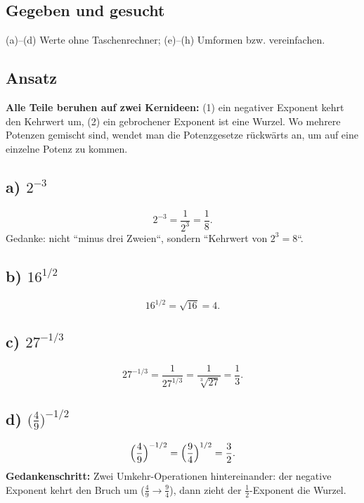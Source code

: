 

\subsection*{Gegeben und gesucht}
(a)--(d) Werte ohne Taschenrechner; (e)--(h) Umformen bzw. vereinfachen.

\subsection*{Ansatz}
\textbf{Alle Teile beruhen auf zwei Kernideen:} (1) ein negativer
Exponent kehrt den Kehrwert um, (2) ein gebrochener Exponent ist eine
Wurzel. Wo mehrere Potenzen gemischt sind, wendet man die
Potenzgesetze rückwärts an, um auf eine einzelne Potenz zu kommen.

\subsection*{a) $2^{-3}$}
\begin{equation}
  2^{-3}=\frac1{2^3}=\frac18 .
\end{equation}
Gedanke: nicht ``minus drei Zweien``, sondern ``Kehrwert von
$2^3=8$``.

\subsection*{b) $16^{1/2}$}
\begin{equation}
  16^{1/2}=\sqrt{16}=4 .
\end{equation}

\subsection*{c) $27^{-1/3}$}
\begin{equation}
  27^{-1/3}=\frac1{27^{1/3}}=\frac1{\sqrt[3]{27}}=\frac13 .
\end{equation}

\subsection*{d) $\bigl(\frac49\bigr)^{-1/2}$}
\begin{equation}
  \Bigl(\frac49\Bigr)^{-1/2}=\Bigl(\frac94\Bigr)^{1/2}=\frac32 .
\end{equation}
\textbf{Gedankenschritt:} Zwei Umkehr-Operationen hintereinander: der
negative Exponent kehrt den Bruch um ($\tfrac49\to\tfrac94$), dann zieht
der $\tfrac12$-Exponent die Wurzel.

